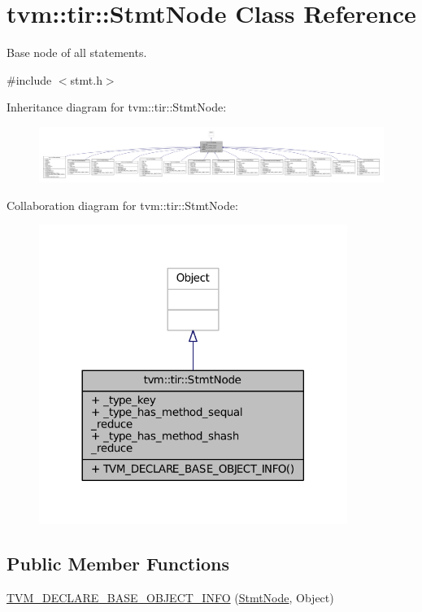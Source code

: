 \hypertarget{classtvm_1_1tir_1_1StmtNode}{}\section{tvm\+:\+:tir\+:\+:Stmt\+Node Class Reference}
\label{classtvm_1_1tir_1_1StmtNode}


Base node of all statements.  




{\ttfamily \#include $<$stmt.\+h$>$}



Inheritance diagram for tvm\+:\+:tir\+:\+:Stmt\+Node\+:
\nopagebreak
\begin{figure}[H]
\begin{center}
\leavevmode
\includegraphics[width=350pt]{classtvm_1_1tir_1_1StmtNode__inherit__graph}
\end{center}
\end{figure}


Collaboration diagram for tvm\+:\+:tir\+:\+:Stmt\+Node\+:
\nopagebreak
\begin{figure}[H]
\begin{center}
\leavevmode
\includegraphics[width=284pt]{classtvm_1_1tir_1_1StmtNode__coll__graph}
\end{center}
\end{figure}
\subsection*{Public Member Functions}
\begin{DoxyCompactItemize}
\item 
\hyperlink{classtvm_1_1tir_1_1StmtNode_ab4627fb1adbea88d4fe3a33679569421}{T\+V\+M\+\_\+\+D\+E\+C\+L\+A\+R\+E\+\_\+\+B\+A\+S\+E\+\_\+\+O\+B\+J\+E\+C\+T\+\_\+\+I\+N\+FO} (\hyperlink{classtvm_1_1tir_1_1StmtNode}{Stmt\+Node}, Object)
\end{DoxyCompactItemize}
